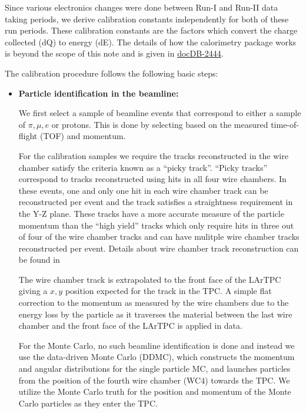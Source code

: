 Since various electronics changes were done between Run-I and Run-II data taking periods, we derive calibration constants independently for both of these run periods. These calibration constants are the factors which convert the charge collected (dQ) to energy (dE). The details of how the calorimetry package works is beyond the scope of this note and is given in \href{http://lartpc-docdb.fnal.gov:8080/cgi-bin/ShowDocument?docid=2444}{docDB-2444}.

The calibration procedure follows the following basic steps:
\begin{itemize}

\item \textbf{Particle identification in the beamline:}

We first select a sample of beamline events that correspond to either a sample of $\pi, \mu, e$ or protons. This is done by selecting based on the measured time-of-flight (TOF) and momentum. 

For the calibration samples we require the tracks reconstructed in the wire chamber satisfy the criteria known as a ``picky track''. ``Picky tracks'' correspond to tracks reconstructed using hits in all four wire chambers. In these events, one and only one hit in each wire chamber track can be reconstructed per event and the track satisfies a straightness requirement in the Y-Z plane. These tracks have a more accurate measure of the particle momentum than the ``high yield'' tracks which only require hits in three out of four of the wire chamber tracks and can have mulitple wire chamber tracks reconstructed per event. Details about wire chamber track reconstruction can be found in \cite{WCTrackReco}

The wire chamber track is extrapolated to the front face of the LArTPC giving a $x, y$ position expected for the track in the TPC. A simple flat correction to the momentum as measured by the wire chambers due to the  energy loss by the particle as it traverses the material between the last wire chamber and the front face of the LArTPC is applied in data. 

For the Monte Carlo, no such beamline identification is done and instead we use the data-driven Monte Carlo (DDMC), which constructs the momentum and angular distributions for the single particle MC, and launches particles from the position of the fourth wire chamber (WC4) towards the TPC. We utilize the Monte Carlo truth for the position and momentum of the Monte Carlo particles as they enter the TPC.


\end{itemize}
